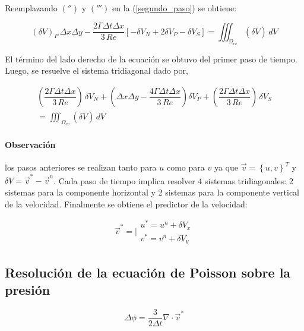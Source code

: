 Reemplazando $('')$ y $(''')$ en la (\ref{segundo_paso}) se obtiene:

\begin{equation}
(\delta V)_P \, \Delta x \Delta y - \dfrac{2 \Gamma \Delta t \Delta x}{3 \, Re} \left[ -\delta V_N + 2 \delta V_P - \delta V_S \right] = \iiint_{\Omega_{cv}} (\delta \overline{V} ) \, dV
\end{equation}

El término del lado derecho de la ecuación se obtuvo del primer paso de tiempo. Luego, se resuelve el sistema tridiagonal dado por,

\begin{equation}
\begin{split}
\left( \dfrac{2 \Gamma \Delta t \Delta x}{3 \, Re} \right) \, \delta V_N + \left( \Delta x \Delta y - \dfrac{4 \Gamma \Delta t \Delta x}{3 \, Re} \right) \delta V_P + \left( \dfrac{2 \Gamma \Delta t \Delta x}{3 \, Re} \right) \, \delta V_S \\
= \iiint_{\Omega_{cv}} (\delta \overline{V} ) \, dV
\end{split}
\end{equation}

\paragraph{Observación} los pasos anteriores se realizan tanto para $u$ como para $v$ ya que $\vec{v}=\left\{ u,v \right\}^T$ y $\delta V = \vec{v}^* - \vec{v}^n $. Cada paso de tiempo implica resolver 4 sistemas tridiagonales: 2 sistemas para la componente horizontal y 2 sistemas para la componente vertical de la velocidad. Finalmente se obtiene el predictor de la velocidad:

\begin{equation}
\vec{v}^* = \Big| \begin{matrix} u^* = u^n + \delta V_x \\ v^* = v^n + \delta V_y
\end{matrix}
\end{equation}

\subsection{Resolución de la ecuación de Poisson sobre la presión}

\begin{equation}
\Delta \phi = \dfrac{3}{2 \Delta t} \nabla \cdot \vec{v}^*
\end{equation}

